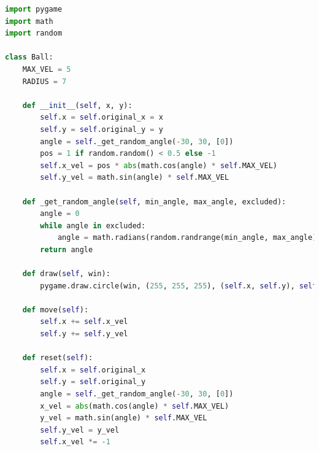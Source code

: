 \documentclass[10pt]{article}
\begin{document}
\begin{lstlisting}[language=Python, caption=ball.py code]
import pygame
import math
import random

class Ball:
    MAX_VEL = 5
    RADIUS = 7

    def __init__(self, x, y):
        self.x = self.original_x = x
        self.y = self.original_y = y
        angle = self._get_random_angle(-30, 30, [0])
        pos = 1 if random.random() < 0.5 else -1
        self.x_vel = pos * abs(math.cos(angle) * self.MAX_VEL)
        self.y_vel = math.sin(angle) * self.MAX_VEL

    def _get_random_angle(self, min_angle, max_angle, excluded):
        angle = 0
        while angle in excluded:
            angle = math.radians(random.randrange(min_angle, max_angle))
        return angle

    def draw(self, win):
        pygame.draw.circle(win, (255, 255, 255), (self.x, self.y), self.RADIUS)

    def move(self):
        self.x += self.x_vel
        self.y += self.y_vel

    def reset(self):
        self.x = self.original_x
        self.y = self.original_y
        angle = self._get_random_angle(-30, 30, [0])
        x_vel = abs(math.cos(angle) * self.MAX_VEL)
        y_vel = math.sin(angle) * self.MAX_VEL
        self.y_vel = y_vel
        self.x_vel *= -1
\end{lstlisting}
\end{document}

